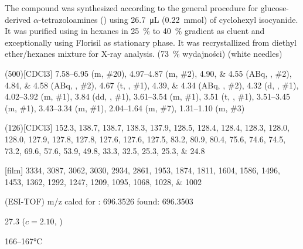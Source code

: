 The compound was synthesized according to the general procedure for glucose-derived $\alpha$-tetrazoloamines () using \SI{26.7}{\micro\liter} (\SI{0.22}{\milli\mol}) of cyclohexyl isocyanide.
It was purified using  in hexanes in \SI{25}{\percent} to \SI{40}{\percent} gradient as eluent and exceptionally using Florisil\textsuperscript{\textregistered} as stationary phase.
It was recrystallized from diethyl ether/hexanes mixture for X-ray analysis.
(\SI{73}{\percent} wydajności) (white needles)
\begin{fullexp}
	\NMR(500)[CDCl3] \numrange{7.58}{6.95} (m, \#{20}), \numrange{4.97}{4.87} (m, \#{2}), \numlist{4.90;4.55} (ABq, , \#{2}), \numlist{4.84;4.58} (ABq, , \#{2}), \num{4.67} (t, , \#{1}), \numlist{4.39;4.34} (ABq, , \#{2}), \num{4.32} (d, , \#{1}), \numrange{4.02}{3.92} (m, \#{1}), \num{3.84} (dd, , \#{1}), \numrange{3.61}{3.54} (m, \#{1}), \num{3.51} (t, , \#{1}), \numrange{3.51}{3.45} (m, \#{1}), \numrange{3.43}{3.34} (m, \#{1}), \numrange{2.04}{1.64} (m, \#{7}), \numrange{1.31}{1.10} (m, \#{3})\par\noindent
	(126)[CDCl3] \numlist{152.3; 138.7; 138.7; 138.3; 137.9; 128.5; 128.4; 128.4; 128.3; 128.0; 128.0; 127.9; 127.8; 127.8; 127.6; 127.6; 127.5; 83.2; 80.9; 80.4; 75.6; 74.6; 74.5; 73.2; 69.6; 57.6; 53.9; 49.8; 33.3; 32.5; 25.3; 25.3; 24.8}\par\noindent
	[film] \numlist{3334; 3087; 3062; 3030; 2934; 2861; 1953; 1874; 1811; 1604; 1586; 1496; 1453; 1362; 1292; 1247; 1209; 1095; 1068; 1028; 1002}\par\noindent
	 (ESI-TOF) m/z calcd for : \num{696.3526} found: \num{696.3503}\par\noindent
	\data{[$\alpha^{23}_D$]~$=$} \num{27.3} ($c = 2.10$, )\par\noindent
	 \numrange{166}{167}\si{\celsius}
\end{fullexp}

